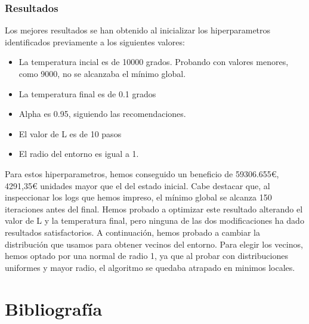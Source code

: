 \documentclass[a4paper,12pt]{article}
\begin{document}
	\subsubsection{Resultados}
	Los mejores resultados se han obtenido al inicializar los hiperparametros identificados previamente a los siguientes valores:
	\begin{itemize}
		\item La temperatura incial es de 10000 grados. Probando con valores menores, como 9000, no se alcanzaba el mínimo global.
		\item La temperatura final es de 0.1 grados
		\item Alpha es 0.95, siguiendo las recomendaciones.
		\item El valor de L es de 10 pasos
		\item El radio del entorno es igual a 1.
	\end{itemize}
	Para estos hiperparametros, hemos conseguido un beneficio de 59306.655€, 4291,35€ unidades mayor que el del estado inicial. Cabe destacar que, 
	al inspeccionar los logs que hemos impreso, el mínimo global se alcanza 150 iteraciones antes del final. Hemos probado a optimizar este
	resultado alterando el valor de L y la temperatura final, pero ninguna de las dos modificaciones ha dado resultados satisfactorios. A continuación,
	hemos probado a cambiar la distribución que usamos para obtener vecinos del entorno. Para elegir los vecinos, hemos optado por una normal de radio 1, ya que 
	al probar con distribuciones uniformes y mayor radio, el algoritmo se quedaba atrapado en minimos locales.
	
\newpage
	\section*{Bibliografía}
	
	
	
\end{document}
